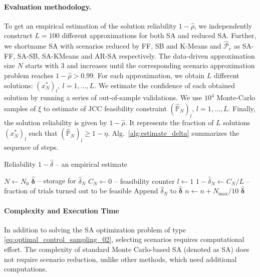 \paragraph{Evaluation methodology.}
To get an empirical estimation of the solution reliability $1-\hat{\rho}$, we independently construct $L=100$ different approximations for both  SA and reduced SA. Further, we shortname SA with scenarios reduced by FF, SB and K-Means and $\hat{\mathcal{P}}_r$ as SA-FF, SA-SB, SA-KMeans and AR-SA respectively. The data-driven approximation size $N$ starts with $3$ and increases until the corresponding scenario approximation problem reaches $1-\hat{\rho} > 0.99$. For each approximation, we obtain $L$ different solutions: $(x^*_N)_l, ~ l=1, \dots, L$. We estimate the confidence of each obtained solution by running a series of out-of-sample validations. We use $10^4$ Monte-Carlo samples of $\xi$ to estimate of JCC feasibility constraint $(\hat{\mathbb{P}}_N)_l$, $l=1, \dots, L$. Finally, the solution reliability is given by $1 - \hat{\rho}$. It represents the fraction of $L$ solutions $(x^*_N)_l$ such that $(\hat{\mathbb{P}}_N)_l \geq 1 - \eta$. 
Alg.~\ref{alg:estimate_delta} summarizes the sequence of steps.

\begin{algorithm}[ht]
\caption{Reliability $1-\hat{\delta}$ -- an empirical estimate}\label{alg:estimate_delta}
$N \gets N_0$\;
$\hat{ \boldsymbol \delta}$ -- storage for $\hat{\delta}_N$\;
{
     $C_N \gets 0$ -- feasibility counter\;
     $l \gets 1$\;
    $1-\hat{\delta}_N \gets C_N / L$ -- fraction of trials turned out to be feasible \;
    Append $\hat{\delta}_N$ to $\hat{ \boldsymbol \delta}$ \;
    $n  \gets n + N_{\max}/ 10$\;
}
\Return $\hat{ \boldsymbol \delta}$
\end{algorithm}

\paragraph{Complexity and Execution Time}
In addition to solving the SA optimization problem of type \eqref{eq:optimal_control_sampling_02}, selecting scenarios requires computational effort. The complexity of standard Monte Carlo-based SA (denoted as SA) does not require scenario reduction, unlike other methods, which need additional computations.

